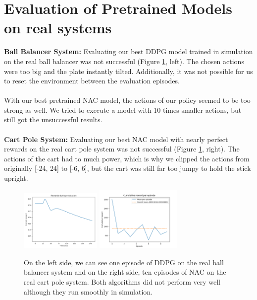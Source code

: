 \section{Evaluation of Pretrained Models on real systems}
\textbf{Ball Balancer System:} Evaluating our best DDPG model trained in simulation on the real ball balancer was not successful (Figure \ref{fig:rr}, left). The chosen actions were too big and the plate instantly tilted. Additionally, it was not possible for us to reset the environment between the evaluation episodes.\\
\\
With our best pretrained NAC model, the actions of our policy seemed to be too strong as well. We tried to execute a model with 10 times smaller actions, but still got the unsuccessful results.\\
\\
\textbf{Cart Pole System:} Evaluating our best NAC model with nearly perfect rewards on the real cart pole system was not successful (Figure \ref{fig:rr}, right). The actions of the cart had to much power, which is why we clipped the actions from originally [-24, 24] to [-6, 6], but the cart was still far too jumpy to hold the stick upright.
\begin{figure}
	\centering
	
	\includegraphics[width=0.35\textwidth]{plots/RR_DDPG_BB_single.png}
	\includegraphics[width=0.37\textwidth]{plots/RR_NAC_CP_10episodes.png}
	
	\caption{On the left side, we can see one episode of DDPG on the real ball balancer system and on the right side, ten episodes of NAC on the real cart pole system. Both algorithms did not perform very well although they run smoothly in simulation.}
	\label{fig:rr}

\end{figure}

